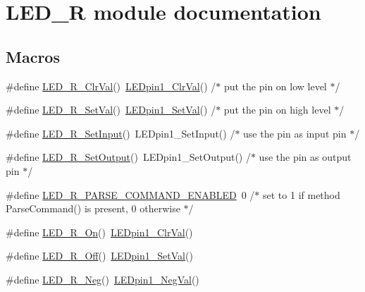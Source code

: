 \hypertarget{group___l_e_d___r__module}{}\section{L\+E\+D\+\_\+R module documentation}
\label{group___l_e_d___r__module}
\subsection*{Macros}
\begin{DoxyCompactItemize}
\item 
\#define \hyperlink{group___l_e_d___r__module_ga7209f37f1b2eaf2d8d8cdfda04bbc013}{L\+E\+D\+\_\+\+R\+\_\+\+Clr\+Val}()~\hyperlink{group___l_e_dpin1__module_gaa8cd76132679a45d7b46009191d7c936}{L\+E\+Dpin1\+\_\+\+Clr\+Val}() /$\ast$ put the pin on low level $\ast$/
\item 
\#define \hyperlink{group___l_e_d___r__module_ga5d736fd16acb71977dbb09bf1cffda89}{L\+E\+D\+\_\+\+R\+\_\+\+Set\+Val}()~\hyperlink{group___l_e_dpin1__module_ga9e387f81ae9dde5b8736c35d6d5002a9}{L\+E\+Dpin1\+\_\+\+Set\+Val}() /$\ast$ put the pin on high level $\ast$/
\item 
\#define \hyperlink{group___l_e_d___r__module_ga6c945513732284ab17cb3c9c68d27522}{L\+E\+D\+\_\+\+R\+\_\+\+Set\+Input}()~L\+E\+Dpin1\+\_\+\+Set\+Input() /$\ast$ use the pin as input pin $\ast$/
\item 
\#define \hyperlink{group___l_e_d___r__module_gacbada495348b46093229970284a9e050}{L\+E\+D\+\_\+\+R\+\_\+\+Set\+Output}()~L\+E\+Dpin1\+\_\+\+Set\+Output() /$\ast$ use the pin as output pin $\ast$/
\item 
\#define \hyperlink{group___l_e_d___r__module_ga4b9ac09901367c58a01a97193b9a1fe4}{L\+E\+D\+\_\+\+R\+\_\+\+P\+A\+R\+S\+E\+\_\+\+C\+O\+M\+M\+A\+N\+D\+\_\+\+E\+N\+A\+B\+L\+ED}~0 /$\ast$ set to 1 if method Parse\+Command() is present, 0 otherwise $\ast$/
\item 
\#define \hyperlink{group___l_e_d___r__module_gae4d0b3ab736a2cc7cb11ae20c5a77193}{L\+E\+D\+\_\+\+R\+\_\+\+On}()~\hyperlink{group___l_e_dpin1__module_gaa8cd76132679a45d7b46009191d7c936}{L\+E\+Dpin1\+\_\+\+Clr\+Val}()
\item 
\#define \hyperlink{group___l_e_d___r__module_gaaa72e85cdb5b4b9f9b25782ede21da2a}{L\+E\+D\+\_\+\+R\+\_\+\+Off}()~\hyperlink{group___l_e_dpin1__module_ga9e387f81ae9dde5b8736c35d6d5002a9}{L\+E\+Dpin1\+\_\+\+Set\+Val}()
\item 
\#define \hyperlink{group___l_e_d___r__module_ga9f7488efa1881e0eedc701bf26287bf1}{L\+E\+D\+\_\+\+R\+\_\+\+Neg}()~\hyperlink{group___l_e_dpin1__module_ga3efa3c36897f65f865e2b08cf6e205c4}{L\+E\+Dpin1\+\_\+\+Neg\+Val}()

\end{DoxyCompactItemize}
